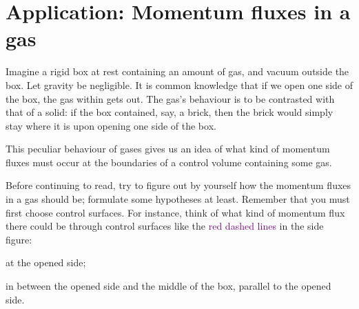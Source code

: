 \documentclass[a4paper,12pt,%
onecolumn,oneside,%
british%
]{memoir}
\renewcommand*{\|}[1][]{\nonscript\:#1\vert\nonscript\:\mathopen{}}
\begin{document}
\section{Application: Momentum fluxes in a gas}
\label{sec:momentumflux_gas}

Imagine a rigid box at rest containing an amount of gas, and vacuum outside the box. Let gravity be negligible. It is common knowledge that if we open one side of the box, the gas within gets out. The gas's behaviour is to be contrasted with that of a solid: if the box contained, say, a brick, then the brick would simply stay where it is upon opening one side of the box.

This peculiar behaviour of gases gives us an idea of what kind of momentum fluxes must occur at the boundaries of a control volume containing some gas.

%
\begin{exercise}
  Before continuing to read, try to figure out by yourself how the momentum fluxes in a gas should be; formulate some hypotheses at least. Remember that you must first choose control surfaces. For instance, think of what kind of momentum flux there could be through control surfaces like the \textcolor{purple}{red dashed lines} in the side figure:
  \begin{enumerate*}[label=(\alph*)]
  \item at the opened side;
  \item in between the opened side and the middle of the box, parallel to the opened side.
  \end{enumerate*}
\end{exercise}
\end{document}
